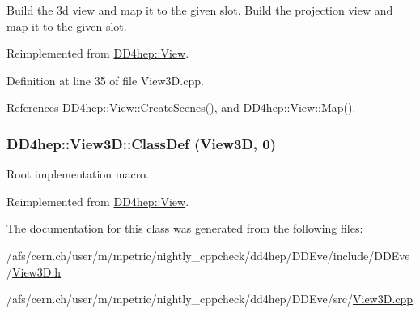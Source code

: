 Build the 3d view and map it to the given slot. Build the projection view and map it to the given slot. 

Reimplemented from \hyperlink{class_d_d4hep_1_1_view_ab4e12874a9cb6a599f268b027443c6ce}{DD4hep::View}.

Definition at line 35 of file View3D.cpp.

References DD4hep::View::CreateScenes(), and DD4hep::View::Map().\hypertarget{class_d_d4hep_1_1_view3_d_af7a20e27b1a1a86cd76af61d17167172}{
\subsubsection[{ClassDef}]{\setlength{\rightskip}{0pt plus 5cm}DD4hep::View3D::ClassDef ({\bf View3D}, \/  0)}}
\label{class_d_d4hep_1_1_view3_d_af7a20e27b1a1a86cd76af61d17167172}


Root implementation macro. 

Reimplemented from \hyperlink{class_d_d4hep_1_1_view_a35dcb8a29c90f0adeba81ad4215be551}{DD4hep::View}.

The documentation for this class was generated from the following files:\begin{DoxyCompactItemize}
\item 
/afs/cern.ch/user/m/mpetric/nightly\_\-cppcheck/dd4hep/DDEve/include/DDEve/\hyperlink{_view3_d_8h}{View3D.h}\item 
/afs/cern.ch/user/m/mpetric/nightly\_\-cppcheck/dd4hep/DDEve/src/\hyperlink{_view3_d_8cpp}{View3D.cpp}\end{DoxyCompactItemize}
